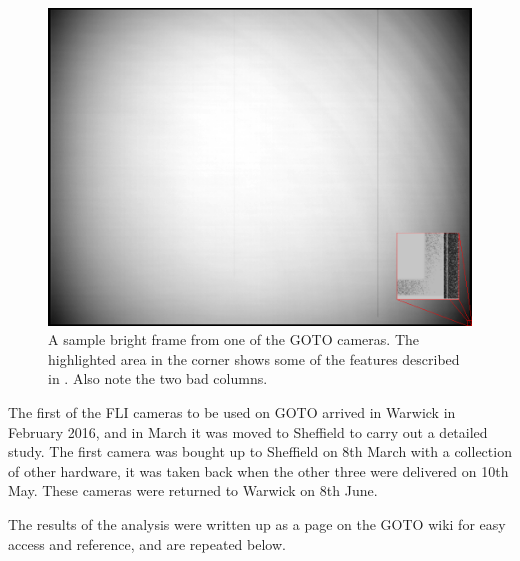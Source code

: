 \begin{colsection}
\begin{colsection}
\begin{figure}[p]
    \begin{center}
        \includegraphics[width=\textwidth]{images/sample.png}
    \end{center}
    \caption[TODO]{
        A sample bright frame from one of the GOTO cameras. The highlighted area in the corner shows some of the features described in . Also note the two bad columns.
        }\label{fig:frame}
\end{figure}

\clearpage

The first of the FLI cameras to be used on GOTO arrived in Warwick in February 2016, and in March it was moved to Sheffield to carry out a detailed study.
The first camera was bought up to Sheffield on 8th March with a collection of other hardware, it was taken back when the other three were delivered on 10th May. These cameras were returned to Warwick on 8th June.

The results of the analysis were written up as a page on the GOTO wiki for easy access and reference, and are repeated below.


\end{colsection}
\end{colsection}
